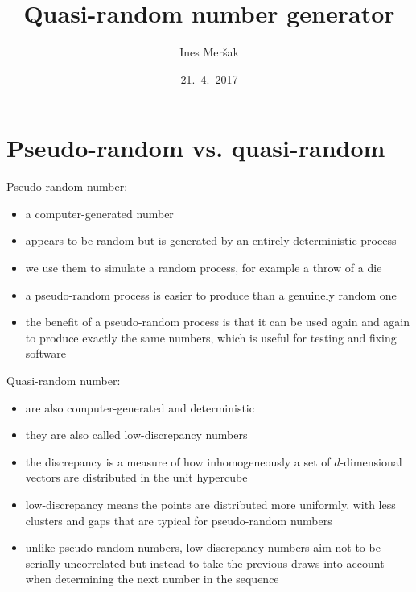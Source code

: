 \documentclass[11pt]{article}
\title{Quasi-random number generator}
\author{Ines Meršak}
\date{21.~4.~2017}
\begin{document}
    \maketitle

\section{Pseudo-random vs. quasi-random}
    Pseudo-random number:
    \begin{itemize}
        \item a computer-generated number
        \item appears to be random but is generated by an entirely deterministic process
        \item we use them to simulate a random process, for example a throw of a die
        \item a pseudo-random process is easier to produce than a genuinely random one
        \item the benefit of a pseudo-random process is that it can be used again and again to produce exactly the same numbers, which is useful for testing and fixing software
    \end{itemize}
    Quasi-random number:
    \begin{itemize}
        \item are also computer-generated and deterministic
        \item they are also called low-discrepancy numbers
        \item the discrepancy is a measure of how inhomogeneously a set of $d$-dimensional vectors are distributed in the unit hypercube
        \item low-discrepancy means the points are distributed more uniformly, with less clusters and gaps that are typical for pseudo-random numbers
        \item unlike pseudo-random numbers, low-discrepancy numbers aim not to be serially uncorrelated but instead to take the previous draws into account when determining the next number in the sequence
    \end{itemize}
\end{document}
